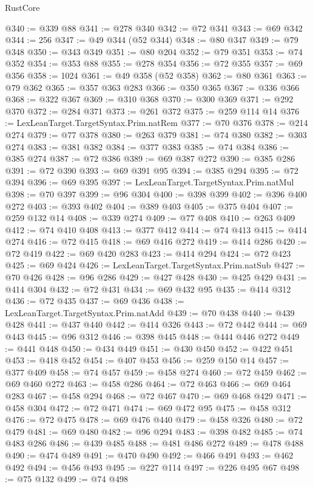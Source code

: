 \begin{lexlean}{RustCore}
\begin{coremodule}
@340 := @339 @88
@341 := @278 @340
@342 := @72 @341
@343 := @69 @342
@344 := 256
@347 := @49 @344 (@52 @344)
@348 := @80 @347
@349 := @79 @348
@350 := @343 @349
@351 := @80 @204
@352 := @79 @351
@353 := @74 @352
@354 := @353 @88
@355 := @278 @354
@356 := @72 @355
@357 := @69 @356
@358 := 1024
@361 := @49 @358 (@52 @358)
@362 := @80 @361
@363 := @79 @362
@365 := @357 @363 @283
@366 := @350 @365
@367 := @336 @366
@368 := @322 @367
@369 := @310 @368
@370 := @300 @369
@371 := @292 @370
@372 := @284 @371
@373 := @261 @372
@375 := @259 @114 @14
@376 := LexLeanTarget.TargetSyntax.Prim.natRem
@377 := @70 @376
@378 := @214 @274
@379 := @77 @378
@380 := @263 @379
@381 := @74 @380
@382 := @303 @274
@383 := @381 @382
@384 := @377 @383
@385 := @74 @384
@386 := @385 @274
@387 := @72 @386
@389 := @69 @387 @272
@390 := @385 @286
@391 := @72 @390
@393 := @69 @391 @95
@394 := @385 @294
@395 := @72 @394
@396 := @69 @395
@397 := LexLeanTarget.TargetSyntax.Prim.natMul
@398 := @70 @397
@399 := @96 @304
@400 := @398 @399
@402 := @396 @400 @272
@403 := @393 @402
@404 := @389 @403
@405 := @375 @404
@407 := @259 @132 @14
@408 := @339 @274
@409 := @77 @408
@410 := @263 @409
@412 := @74 @410 @408
@413 := @377 @412
@414 := @74 @413
@415 := @414 @274
@416 := @72 @415
@418 := @69 @416 @272
@419 := @414 @286
@420 := @72 @419
@422 := @69 @420 @283
@423 := @414 @294
@424 := @72 @423
@425 := @69 @424
@426 := LexLeanTarget.TargetSyntax.Prim.natSub
@427 := @70 @426
@428 := @96 @286
@429 := @427 @428
@430 := @425 @429
@431 := @414 @304
@432 := @72 @431
@434 := @69 @432 @95
@435 := @414 @312
@436 := @72 @435
@437 := @69 @436
@438 := LexLeanTarget.TargetSyntax.Prim.natAdd
@439 := @70 @438
@440 := @439 @428
@441 := @437 @440
@442 := @414 @326
@443 := @72 @442
@444 := @69 @443
@445 := @96 @312
@446 := @398 @445
@448 := @444 @446 @272
@449 := @441 @448
@450 := @434 @449
@451 := @430 @450
@452 := @422 @451
@453 := @418 @452
@454 := @407 @453
@456 := @259 @150 @14
@457 := @377 @409
@458 := @74 @457
@459 := @458 @274
@460 := @72 @459
@462 := @69 @460 @272
@463 := @458 @286
@464 := @72 @463
@466 := @69 @464 @283
@467 := @458 @294
@468 := @72 @467
@470 := @69 @468 @429
@471 := @458 @304
@472 := @72 @471
@474 := @69 @472 @95
@475 := @458 @312
@476 := @72 @475
@478 := @69 @476 @440
@479 := @458 @326
@480 := @72 @479
@481 := @69 @480
@482 := @96 @294
@483 := @398 @482
@485 := @74 @483 @286
@486 := @439 @485
@488 := @481 @486 @272
@489 := @478 @488
@490 := @474 @489
@491 := @470 @490
@492 := @466 @491
@493 := @462 @492
@494 := @456 @493
@495 := @227 @114
@497 := @226 @495 @67
@498 := @75 @132
@499 := @74 @498

\end{coremodule}
\end{lexlean}
